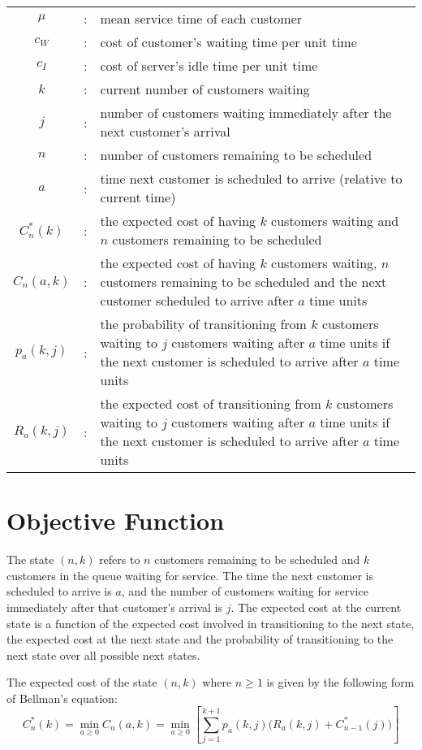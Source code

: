 \begin{tabularx}{\textwidth}{c c X}
	$\mu$ & : & mean service time of each customer \\
	$c_{W}$ & : & cost of customer's waiting time per unit time \\
	$c_{I}$ & : & cost of server's idle time per unit time \\
	$k$ & : & current number of customers waiting \\
	$j$ & : & number of customers waiting immediately after the next customer's arrival \\
	$n$ & : & number of customers remaining to be scheduled \\
	$a$ & : & time next customer is scheduled to arrive (relative to current time) \\
	$C_{n}^{*} (k)$ & : & the expected cost of having $k$ customers waiting and $n$ customers remaining to be scheduled \\
	$C_{n} (a, k)$ & : & the expected cost of having $k$ customers waiting, $n$ customers remaining to be scheduled and the next customer scheduled to arrive after $a$ time units \\
	$p_{a} (k, j)$ & : & the probability of transitioning from $k$ customers waiting to $j$ customers waiting after $a$ time units if the next customer is scheduled to arrive after $a$ time units \\
	$R_{a} (k, j)$ & : & the expected cost of transitioning from $k$ customers waiting to $j$ customers waiting after $a$ time units if the next customer is scheduled to arrive after $a$ time units
\end{tabularx}

\section{Objective Function}

The state $(n, k)$ refers to $n$ customers remaining to be scheduled and $k$ customers in the queue waiting for service. The time the next customer is scheduled to arrive is $a$, and the number of customers waiting for service immediately after that customer's arrival is $j$. The expected cost at the current state is a function of the expected cost involved in transitioning to the next state, the expected cost at the next state and the probability of transitioning to the next state over all possible next states. 

The expected cost of the state $(n, k)$ where $n \geq 1$ is given by the following form of Bellman's equation:
\begin{equation} \label{Bellman}
	C_{n}^{*} (k) = \min_{a \geq 0} C_{n} (a, k) = \min_{a \geq 0} \left[ \sum_{j = 1}^{k + 1} p_{a} (k, j) \Big( R_{a} (k, j) + C_{n - 1}^{*} (j) \Big) \right]
\end{equation}

